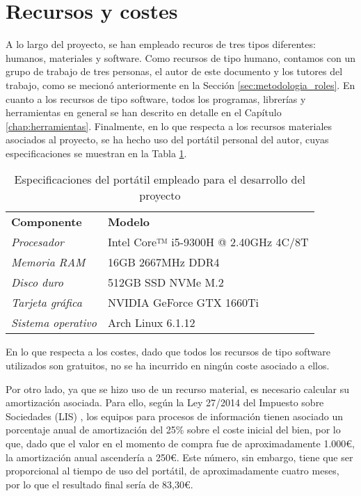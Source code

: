 \section{Recursos y costes}
\label{sec:planificacion_costes}

A lo largo del proyecto, se han empleado recuros de tres tipos diferentes: humanos, materiales y software.
Como recursos de tipo humano,
contamos con un grupo de trabajo de tres personas, el autor de este documento y los tutores del trabajo, 
como se mecionó anteriormente en la Sección \ref{sec:metodologia_roles}.
En cuanto a los recursos de tipo software, todos los programas, librerías y herramientas en general
se han descrito en detalle en el Capítulo \ref{chap:herramientas}.
Finalmente, en lo que respecta a los recursos materiales asociados al proyecto, se ha hecho uso del portátil personal del autor, 
cuyas especificaciones se muestran en la Tabla \ref{tab:costes_hardware}.

\bigskip
\begin{table}[H]
	\centering
	\begin{tabular}{l|l}
		\rowcolor{udcpink!25}
		\small \textbf{Componente} & \small \textbf{Modelo} \\
		\small \textit{Procesador} & \small Intel Core™ i5-9300H @ 2.40GHz 4C/8T \\
		\small \textit{Memoria RAM} & \small 16GB 2667MHz DDR4 \\
		\small \textit{Disco duro} & \small 512GB SSD NVMe M.2 \\
		\small \textit{Tarjeta gráfica} & \small NVIDIA GeForce GTX 1660Ti \\
		\small \textit{Sistema operativo} & \small Arch Linux 6.1.12 \\
	\end{tabular}
	\caption{Especificaciones del portátil empleado para el desarrollo del proyecto}
	\label{tab:costes_hardware}
\end{table}

\bigskip
En lo que respecta a los costes, dado que todos los recursos de tipo software utilizados son gratuitos, no se ha incurrido en ningún coste
asociado a ellos.

\bigskip
Por otro lado, ya que se hizo uso de un recurso material,
es necesario calcular su amortización asociada. Para ello, según la Ley 27/2014 del Impuesto sobre Sociedades (LIS) \cite{leysociedades},
los equipos para procesos de información tienen asociado un porcentaje anual de amortización del 25\% sobre el coste inicial del bien,
por lo que, dado que el valor en el momento de compra fue de aproximadamente 1.000€, la amortización anual ascendería a 250€. Este número, sin embargo,
tiene que ser proporcional al tiempo de uso del portátil, de aproximadamente cuatro meses, por lo que el resultado final sería de 83,30€.

